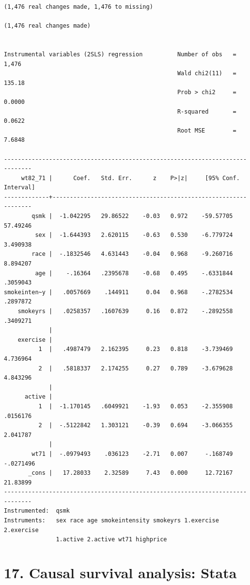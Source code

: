 \documentclass[
  10pt,
]{book}
\begin{document}
\begin{verbatim}
(1,476 real changes made, 1,476 to missing)

(1,476 real changes made)


Instrumental variables (2SLS) regression          Number of obs   =      1,476
                                                  Wald chi2(11)   =     135.18
                                                  Prob > chi2     =     0.0000
                                                  R-squared       =     0.0622
                                                  Root MSE        =     7.6848

------------------------------------------------------------------------------
     wt82_71 |      Coef.   Std. Err.      z    P>|z|     [95% Conf. Interval]
-------------+----------------------------------------------------------------
        qsmk |  -1.042295   29.86522    -0.03   0.972    -59.57705    57.49246
         sex |  -1.644393   2.620115    -0.63   0.530    -6.779724    3.490938
        race |  -.1832546   4.631443    -0.04   0.968    -9.260716    8.894207
         age |    -.16364   .2395678    -0.68   0.495    -.6331844    .3059043
smokeinten~y |   .0057669    .144911     0.04   0.968    -.2782534    .2897872
    smokeyrs |   .0258357   .1607639     0.16   0.872    -.2892558    .3409271
             |
    exercise |
          1  |   .4987479   2.162395     0.23   0.818    -3.739469    4.736964
          2  |   .5818337   2.174255     0.27   0.789    -3.679628    4.843296
             |
      active |
          1  |  -1.170145   .6049921    -1.93   0.053    -2.355908    .0156176
          2  |  -.5122842   1.303121    -0.39   0.694    -3.066355    2.041787
             |
        wt71 |  -.0979493    .036123    -2.71   0.007     -.168749   -.0271496
       _cons |   17.28033    2.32589     7.43   0.000     12.72167    21.83899
------------------------------------------------------------------------------
Instrumented:  qsmk
Instruments:   sex race age smokeintensity smokeyrs 1.exercise 2.exercise
               1.active 2.active wt71 highprice
\end{verbatim}

\hypertarget{causal-survival-analysis-stata}{%
\chapter*{17. Causal survival analysis: Stata}\label{causal-survival-analysis-stata}}
\end{document}
